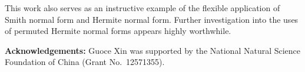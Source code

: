 \documentclass[reqno, 12pt]{article}
\theoremstyle{mydefinition}
\theoremstyle{myremark}
\numberwithin{algorithm}{section}
\begin{document}
This work also serves as an instructive example of the flexible application of Smith normal form and Hermite normal form. Further investigation into the uses of permuted Hermite normal forms appears highly worthwhile.











\noindent
{\small \textbf{Acknowledgements:}}
Guoce Xin was supported by the National Natural Science Foundation of China (Grant No.\ 12571355).
\end{document}
